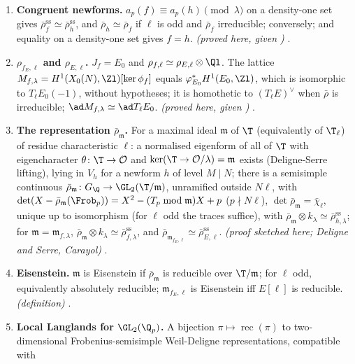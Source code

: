 \begin{enumerate}[label=\textbf{\thechapter.\arabic*}]
irreducible all stable lattices are homothetic. \emph{(proved here, given )} .
\item \textbf{Congruent newforms.} $a_p(f)\equiv a_p(h)\pmod\lambda$ on a density-one set gives $\bar\rho_f^{\mathrm{ss}}\simeq\bar\rho_h^{\mathrm{ss}}$, and $\bar\rho_h\simeq\bar\rho_f$ if $\ell$ is odd and $\bar\rho_f$
irreducible; conversely; and equality on a density-one set gives $f=h$. \emph{(proved here, given )} .
\item \textbf{$\rho_{f_E,\ell}$ and $\rho_{E,\ell}$.} $J_f=E_0$ and $\rho_{f,\ell}\simeq\rho_{E,\ell}\otimes\Ql$. The lattice $M_{f,\lambda}=H^1(X_0(N),\Zl)[\ker\phi_f]$ equals $\varphi_{E_0}^*H^1(E_0,\Zl)$, which is isomorphic to
$T_\ell E_0(-1)$, without hypotheses; it is homothetic to $(T_\ell E)^\vee$ when $\bar\rho$ is irreducible; $\ad M_{f,\lambda}\simeq\ad T_\ell E_0$. \emph{(proved here, given )}
.
\item \textbf{The representation $\bar\rho_{\mathfrak m}$.} For a maximal ideal $\mathfrak m$ of $\T$ (equivalently of $\T_\ell$) of residue characteristic $\ell$: a normalised eigenform of all of $\T$ with
eigencharacter $\theta\colon\T\to\mathcal{O}$ and $\ker(\T\to\mathcal{O}/\lambda)=\mathfrak m$ exists (Deligne-Serre lifting), lying in $V_h$ for a newform $h$ of level $M\mid N$; there is a semisimple continuous
$\bar\rho_{\mathfrak m}\colon G_\Q\to\GL_2(\T/\mathfrak m)$, unramified outside $N\ell$, with $\det(X-\bar\rho_{\mathfrak m}(\Frob_p))=X^2-(T_p\bmod\mathfrak m)X+p$ ($p\nmid N\ell$), $\det\bar\rho_{\mathfrak m}=\bar\chi_\ell$, unique up to
isomorphism (for $\ell$ odd the traces suffice), with $\bar\rho_{\mathfrak m}\otimes k_\lambda\simeq\bar\rho_{h,\lambda}^{\mathrm{ss}}$; for $\mathfrak m=\mathfrak m_{f,\lambda}$, $\bar\rho_{\mathfrak m}\otimes k_\lambda\simeq\bar\rho_{f,\lambda}^{\mathrm{ss}}$, and $\bar\rho_{\mathfrak m_{f_E,\ell}}\simeq\bar\rho_{E,\ell}^{\mathrm{ss}}$.
\emph{(proof sketched here; Deligne and Serre, Carayol)} .
\item \textbf{Eisenstein.} $\mathfrak m$ is Eisenstein if $\bar\rho_{\mathfrak m}$ is reducible over $\T/\mathfrak m$; for $\ell$ odd, equivalently absolutely reducible; $\mathfrak m_{f_E,\ell}$ is Eisenstein iff
$E[\ell]$ is reducible. \emph{(definition)} .
\item \textbf{Local Langlands for $\GL_2(\Q_p)$.} A bijection $\pi\mapsto\operatorname{rec}(\pi)$ to two-dimensional Frobenius-semisimple Weil-Deligne representations, compatible with

\end{enumerate}
